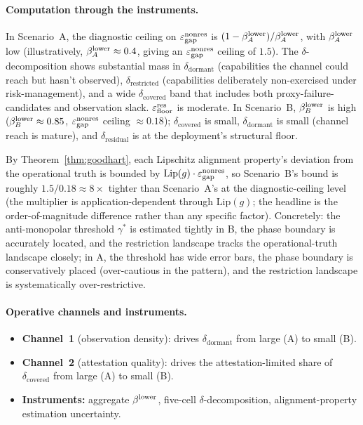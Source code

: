 \paragraph{Computation through the instruments.}
In Scenario~A, the diagnostic ceiling on $\varepsilon_{\mathrm{gap}}^{\mathrm{nonres}}$ is
$(1 - \beta^{\mathrm{lower}}_A)/\beta^{\mathrm{lower}}_A$, with $\beta^{\mathrm{lower}}_A$ low (illustratively,
$\beta^{\mathrm{lower}}_A \approx 0.4$, giving an $\varepsilon_{\mathrm{gap}}^{\mathrm{nonres}}$ ceiling of $1.5$).
The $\delta$-decomposition shows substantial mass in
$\delta_{\mathrm{dormant}}$ (capabilities the channel could
reach but hasn't observed),
$\delta_{\mathrm{restricted}}$ (capabilities deliberately
non-exercised under risk-management), and a wide
$\delta_{\mathrm{covered}}$ band that includes both
proxy-failure-candidates and observation slack.  $\varepsilon_{\mathrm{floor}}^{\mathrm{res}}$
is moderate.  In Scenario~B, $\beta^{\mathrm{lower}}_B$ is high
($\beta^{\mathrm{lower}}_B \approx 0.85$, $\varepsilon_{\mathrm{gap}}^{\mathrm{nonres}}$ ceiling $\approx 0.18$);
$\delta_{\mathrm{covered}}$ is small, $\delta_{\mathrm{dormant}}$
is small (channel reach is mature), and $\delta_{\mathrm{residual}}$
is at the deployment's structural floor.

By Theorem~\ref{thm:goodhart}, each Lipschitz alignment
property's deviation from the operational truth is bounded by
$\mathrm{Lip}(g) \cdot \varepsilon_{\mathrm{gap}}^{\mathrm{nonres}}$, so Scenario~B's bound is
roughly $1.5/0.18 \approx 8\times$ tighter than
Scenario~A's at the diagnostic-ceiling level (the
multiplier is application-dependent through $\mathrm{Lip}(g)$;
the headline is the order-of-magnitude difference rather than
any specific factor).  Concretely: the anti-monopolar threshold
$\gamma^*$ is estimated tightly in B, the phase boundary is
accurately located, and the restriction landscape tracks the
operational-truth landscape closely; in A, the threshold has
wide error bars, the phase boundary is conservatively placed
(over-cautious in the
\citep[Wamura]{lasser2026wamura} pattern), and the
restriction landscape is systematically over-restrictive.

\paragraph{Operative channels and instruments.}
\begin{itemize}
\item \textbf{Channel~1} (observation density): drives
  $\delta_{\mathrm{dormant}}$ from large (A) to small (B).
\item \textbf{Channel~2} (attestation quality): drives the
  attestation-limited share of $\delta_{\mathrm{covered}}$
  from large (A) to small (B).
\item \textbf{Instruments:} aggregate $\beta^{\mathrm{lower}}$, five-cell
  $\delta$-decomposition, alignment-property estimation
  uncertainty.
\end{itemize}

